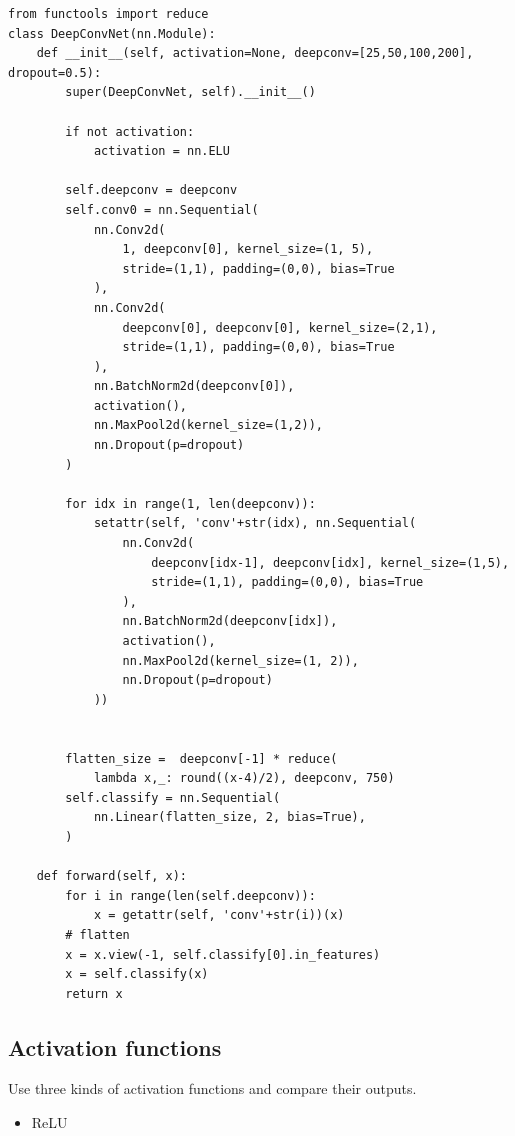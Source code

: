 \documentclass[12pt]{article}
\begin{document}
\begin{verbatim}
from functools import reduce
class DeepConvNet(nn.Module):
    def __init__(self, activation=None, deepconv=[25,50,100,200], dropout=0.5):
        super(DeepConvNet, self).__init__()
        
        if not activation:
            activation = nn.ELU
        
        self.deepconv = deepconv
        self.conv0 = nn.Sequential(
            nn.Conv2d(
                1, deepconv[0], kernel_size=(1, 5),
                stride=(1,1), padding=(0,0), bias=True
            ),
            nn.Conv2d(
                deepconv[0], deepconv[0], kernel_size=(2,1),
                stride=(1,1), padding=(0,0), bias=True
            ),
            nn.BatchNorm2d(deepconv[0]),
            activation(),
            nn.MaxPool2d(kernel_size=(1,2)),
            nn.Dropout(p=dropout)
        )
        
        for idx in range(1, len(deepconv)):
            setattr(self, 'conv'+str(idx), nn.Sequential(
                nn.Conv2d(
                    deepconv[idx-1], deepconv[idx], kernel_size=(1,5),
                    stride=(1,1), padding=(0,0), bias=True
                ),
                nn.BatchNorm2d(deepconv[idx]),
                activation(),
                nn.MaxPool2d(kernel_size=(1, 2)),
                nn.Dropout(p=dropout)
            ))
        
        
        flatten_size =  deepconv[-1] * reduce(
            lambda x,_: round((x-4)/2), deepconv, 750)
        self.classify = nn.Sequential(
            nn.Linear(flatten_size, 2, bias=True),
        )
    
    def forward(self, x):
        for i in range(len(self.deepconv)):
            x = getattr(self, 'conv'+str(i))(x)
        # flatten
        x = x.view(-1, self.classify[0].in_features)
        x = self.classify(x)
        return x
\end{verbatim}

\subsection{Activation functions}

Use three kinds of activation functions and compare their outputs.

\begin{itemize}
\item ReLU
\end{itemize}
\end{document}
